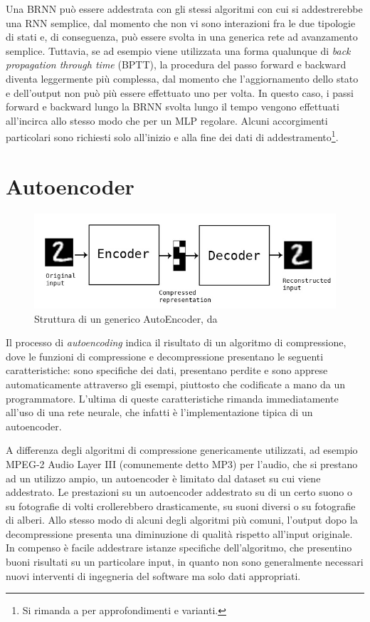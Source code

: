 Una BRNN può essere addestrata con gli stessi algoritmi con cui si addestrerebbe una RNN semplice, dal momento che non vi sono interazioni fra le due tipologie di stati e, di conseguenza, può essere svolta in una generica rete ad avanzamento semplice. Tuttavia, se ad esempio viene utilizzata una forma qualunque di \textit{back propagation through time} (BPTT), la procedura del passo forward e backward diventa leggermente più complessa, dal momento che l'aggiornamento dello stato e dell'output non può più essere effettuato uno per volta. In questo caso, i passi forward e backward lungo la BRNN svolta lungo il tempo vengono effettuati all'incirca allo stesso modo che per un MLP regolare. Alcuni accorgimenti particolari sono richiesti solo all'inizio e alla fine dei dati di addestramento\footnote{Si rimanda a \cite{BRNN} per approfondimenti e varianti.}.
\section{Autoencoder}
\begin{figure}[ht]
	\centering
	\includegraphics[width=0.8\linewidth]{img/autoencoder_schema.jpg}
	\caption{Struttura di un generico AutoEncoder, da \cite{keras_blog}}
	\label{fig:1.12}
\end{figure}
Il processo di \textit{autoencoding} indica il risultato di un algoritmo di compressione, dove le funzioni di compressione e decompressione presentano le seguenti caratteristiche: sono specifiche dei dati, presentano perdite e sono apprese automaticamente attraverso gli esempi, piuttosto che codificate a mano da un programmatore. L'ultima di queste caratteristiche rimanda immediatamente all'uso di una rete neurale, che infatti è l'implementazione tipica di un autoencoder.

A differenza degli algoritmi di compressione genericamente utilizzati, ad esempio MPEG-2 Audio Layer III (comunemente detto MP3) per l'audio, che si prestano ad un utilizzo ampio, un autoencoder è limitato dal dataset su cui viene addestrato. Le prestazioni su un autoencoder addestrato su di un certo suono o su fotografie di volti crollerebbero drasticamente, su suoni diversi o su fotografie di alberi. Allo stesso modo di alcuni degli algoritmi più comuni, l'output dopo la decompressione presenta una diminuzione di qualità rispetto all'input originale. In compenso è facile addestrare istanze specifiche dell'algoritmo, che presentino buoni risultati su un particolare input, in quanto non sono generalmente necessari nuovi interventi di ingegneria del software ma solo dati appropriati.

